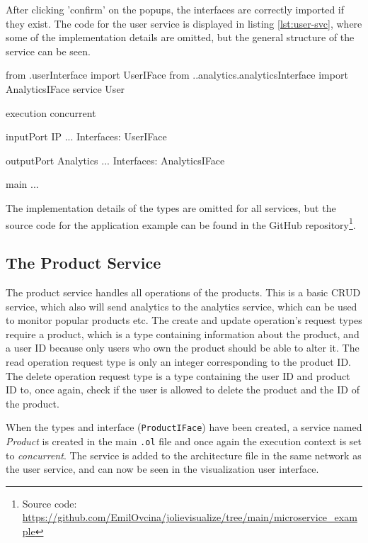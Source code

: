 After clicking 'confirm' on the popups, the interfaces are correctly imported if they exist. The code for the user service is displayed in
listing \ref*{lst:user-svc}, where some of the implementation details are omitted, but the general structure of the service can be seen.

\begin{jolisting}[][caption={The user service after the ports have been created with omitted implementation details.}, label={lst:user-svc}]
from .userInterface import UserIFace
from ..analytics.analyticsInterface import AnalyticsIFace
service User {

    execution{ concurrent }

    inputPort IP {
        ...
        Interfaces: UserIFace
    }

    outputPort Analytics {
        ...
        Interfaces: AnalyticsIFace
    }

    main {
        ...
    }
}
\end{jolisting}

The implementation details of the types are omitted for all services, but the source code for the application example can be found in the GitHub repository\footnote{Source code: \url{https://github.com/EmilOvcina/jolievisualize/tree/main/microservice_example}}.

\subsection{The Product Service}
The product service handles all operations of the products. This is a basic CRUD service, which also will send analytics to the analytics service, which can be used to monitor popular products etc.
The create and update operation's request types require a product, which is a type containing information about the product, and a user ID because only users who own the product should be able to alter it.
The read operation request type is only an integer corresponding to the product ID. The delete operation request type is a type containing the user ID and product ID to, once again, check if the user is allowed to delete the product and the ID of the product.

When the types and interface (\texttt{ProductIFace}) have been created,
a service named \textit{Product} is created in the main \texttt{.ol} file and once again the execution context is set to \textit{concurrent}.
The service is added to the architecture file in the same network as the user service, and can now be seen in the visualization user interface.

